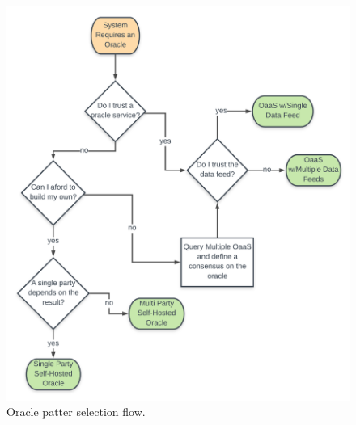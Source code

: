 \begin{figure}[t]
  \begin{center}
    \leavevmode
    \includegraphics[width=1\textwidth]{figures/oracle-pattern-flow.png}
    \caption{Oracle patter selection flow.}
    \label{fig:/figures/oracle-pattern-flow}
  \end{center}
\end{figure}


